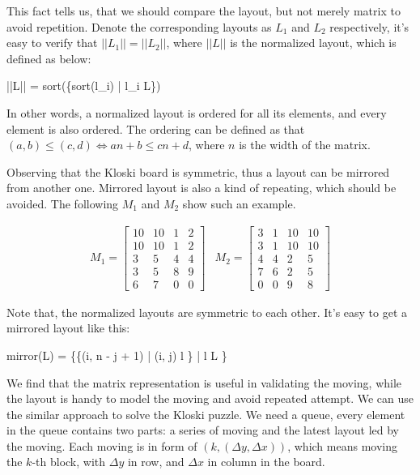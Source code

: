 \documentclass[UTF8]{article}
\begin{document}
This fact tells us, that we should compare the layout, but not merely matrix to avoid
repetition. Denote the corresponding layouts as $L_1$ and $L_2$ respectively, it's
easy to verify that $||L_1|| = ||L_2||$, where $||L||$ is the normalized layout, which
is defined as below:

\be
||L|| = sort(\{sort(l_i) | \forall l_i \in L\})
\ee

In other words, a normalized layout is ordered for all its elements, and every element
is also ordered. The ordering can be defined as that $(a, b) \leq (c, d) \Leftrightarrow
a n + b \leq c n + d$, where $n$ is the width of the matrix.

Observing that the Kloski board is symmetric, thus a layout can be mirrored from
another one. Mirrored layout is also a kind of repeating, which should be avoided.
The following $M_1$ and $M_2$ show such an example.

\[
\begin{array}{cc}
M_1 = \left [
  \begin{array}{cccc}
  10 & 10 & 1 & 2 \\
  10 & 10 & 1 & 2 \\
  3 & 5 & 4 & 4 \\
  3 & 5 & 8 & 9 \\
  6 & 7 & 0 & 0
  \end{array}
\right ] &
M_2 = \left [
  \begin{array}{cccc}
  3 & 1 & 10 & 10 \\
  3 & 1 & 10 & 10 \\
  4 & 4 & 2 & 5 \\
  7 & 6 & 2 & 5 \\
  0 & 0 & 9 & 8
  \end{array}
\right ]
\end{array}
\]

Note that, the normalized layouts are symmetric to each other.
It's easy to get a mirrored layout like this:

\be
mirror(L) = \{\{(i, n - j + 1) | \forall (i, j) \in l \} | \forall l \in L \}
\ee

We find that the matrix representation is useful in validating the moving, while the
layout is handy to model the moving and avoid repeated attempt. We can use the similar
approach to solve the Kloski puzzle. We need a queue, every element in the queue
contains two parts: a series of moving and the latest layout led by the moving.
Each moving is in form of $(k, (\Delta y, \Delta x))$, which means moving the $k$-th
block, with $\Delta y$ in row, and $\Delta x$ in column in the board.
\end{document}

